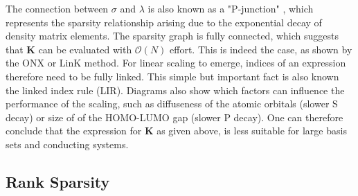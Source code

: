 \begin{center}
\end{center}
\noindent The connection between $\sigma$ and $\lambda$ is also known as a "P-junction" \cite{Nee2009}, which represents the sparsity relationship arising due to the exponential decay of density matrix elements. The sparsity graph is fully connected, which suggests that $\mathbf{K}$ can be evaluated with $\mathcal{O}(N)$ effort. This is indeed the case, as shown by the ONX or LinK method. For linear scaling to emerge, indices of an expression therefore need to be fully linked. This simple but important fact is also known the linked index rule (LIR). Diagrams also show which factors can influence the performance of the scaling, such as diffuseness of the atomic orbitals (slower S decay) or size of of the HOMO-LUMO gap (slower P decay). One can therefore conclude that the expression for $\mathbf{K}$ as given above, is less suitable for large basis sets and conducting systems.

\subsection{Rank Sparsity}

